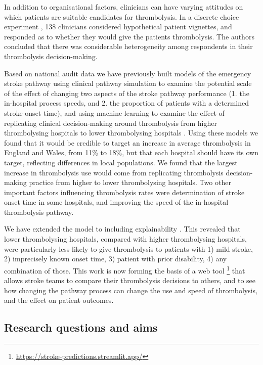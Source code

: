 In addition to organisational factors, clinicians can have varying attitudes on which patients are suitable candidates for thrombolysis. In a discrete choice experiment \cite{de_brun_factors_2018}, 138 clinicians considered hypothetical patient vignettes, and responded as to whether they would give the patients thrombolysis. The authors concluded that there was considerable heterogeneity among respondents in their thrombolysis decision-making. 

Based on national audit data we have previously built models of the emergency stroke pathway using clinical pathway simulation to examine the potential scale of the effect of changing two aspects of the stroke pathway performance (1. the in-hospital process speeds, and 2. the proportion of patients with a determined stroke onset time), and using machine learning to examine the effect of replicating clinical decision-making around thrombolysis from higher thrombolysing hospitals to lower thrombolysing hospitals \cite{allen_using_2022, allen_use_2022}. Using these models we found that it would be credible to target an increase in average thrombolysis in England and Wales, from 11\% to 18\%, but that each hospital should have its own target, reflecting differences in local populations. We found that the largest increase in thrombolysis use would come from replicating thrombolysis decision-making practice from higher to lower thrombolysing hospitals. Two other important factors influencing thrombolysis rates were determination of stroke onset time in some hospitals, and improving the speed of the in-hospital thrombolysis pathway.

We have extended the model to including explainability \cite{pearn_what_2023}. This revealed that lower thrombolysing hospitals, compared with higher thrombolysing hospitals, were particularly less likely to give thrombolysis to patients with 1) mild stroke, 2) imprecisely known onset time, 3) patient with prior disability, 4) any combination of those. This work is now forming the basis of a web tool \footnote{\url{https://stroke-predictions.streamlit.app/}} that allows stroke teams to compare their thrombolysis decisions to others, and to see how changing the pathway process can change the use and speed of thrombolysis, and the effect on patient outcomes.

\subsection{Research questions and aims}

